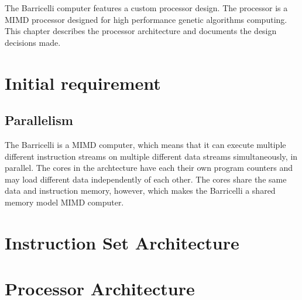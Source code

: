 The Barricelli computer features a custom processor design.
The processor is a MIMD processor designed for high performance genetic algorithms computing.
This chapter describes the processor architecture and documents the design decisions made.

\section {Initial requirement}
     \label{fpga:section:initial_requirements}
\subsection{Parallelism}

The Barricelli is a MIMD computer, which means that it can execute multiple different instruction streams on multiple different data streams simultaneously, in parallel.
The cores in the archtecture have each their own program counters and may load different data independently of each other.
The cores share the same data and instruction memory, however, which makes the Barricelli a shared memory model MIMD computer.
 


\section{Instruction Set Architecture} \label{fpga:isa:s:isa}
    

\section {Processor Architecture}
     \label{fpga:section:cpu_architecture}